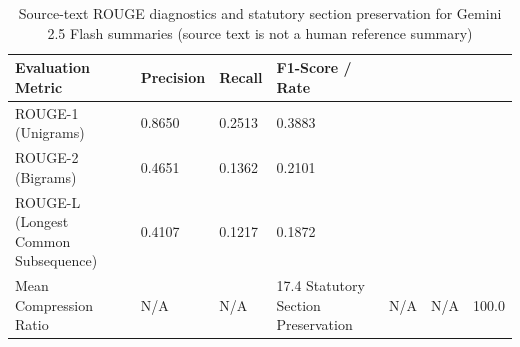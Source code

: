 \begin{table}
\caption{Source-text ROUGE diagnostics and statutory section preservation for Gemini 2.5 Flash summaries (source text is not a human reference summary)}
\label{tab:rouge_metrics}
\begin{tabular}{llll}
\toprule
Evaluation Metric & Precision & Recall & F1-Score / Rate \\
\midrule
ROUGE-1 (Unigrams) & 0.8650 & 0.2513 & 0.3883 \\
ROUGE-2 (Bigrams) & 0.4651 & 0.1362 & 0.2101 \\
ROUGE-L (Longest Common Subsequence) & 0.4107 & 0.1217 & 0.1872 \\
Mean Compression Ratio & N/A & N/A & 17.4%
Statutory Section Preservation & N/A & N/A & 100.0%
\bottomrule
\end{tabular}
\end{table}
